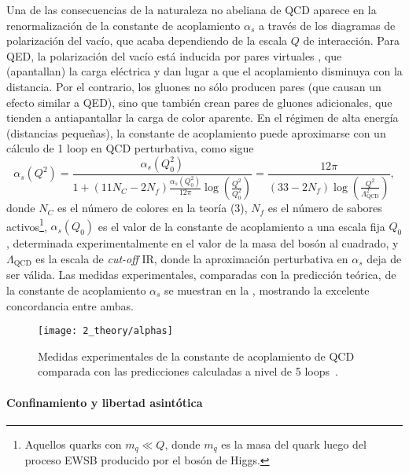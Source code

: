 Una de las consecuencias de la naturaleza no abeliana de \ac{QCD} aparece en la renormalización de la constante de acoplamiento \(\alpha_s\) a través de los diagramas de polarización del vacío, que acaba dependiendo de la escala \(Q\) de interacción. Para \ac{QED}, la polarización del vacío está inducida por pares virtuales \ee, que (apantallan) la carga eléctrica y dan lugar a que el acoplamiento disminuya con la distancia. Por el contrario, los gluones no sólo producen pares \qqbar (que causan un efecto similar a \ac{QED}), sino que también crean pares de gluones adicionales, que tienden a antiapantallar la carga de color aparente. En el régimen de alta energía (distancias pequeñas), la constante de acoplamiento puede aproximarse con un cálculo de 1 loop en \ac{QCD} perturbativa, como sigue
\begin{equation}
    \label{eq:theory:sm:mathematical:qcd:alphas}
    \alpha_s\left(Q^2\right) = 
    \frac{
        \alpha_s\left(Q^2_0\right)
    }{
        1 + \left(11 N_C - 2 N_f\right) \frac{\alpha_s\left(Q_0^2\right)}{12\pi} \log \left(\frac{Q^2}{Q_0^2}\right)
    }
    =
    \frac{
        12\pi
    }{
        \left(33 - 2 N_f\right)  \log \left(\frac{Q^2}{\Lambda_{\text{QCD}}^2}\right)
    },
\end{equation}
donde \(N_C\) es el número de colores en la teoría (3), \(N_f\) es el número de sabores activos\footnote{Aquellos quarks con \(m_q \ll Q\), donde \(m_q\) es la masa del quark luego del proceso \ac{EWSB} producido por el bosón de Higgs.}, \(\alpha_s\left(Q_0\right)\) es el valor de la constante de acoplamiento a una escala fija \(Q_0\), determinada experimentalmente en el valor de la masa del bosón \Zboson al cuadrado, y \(\Lambda_{\text{QCD}}\) es la escala de \textit{cut-off} \ac{IR}, donde la aproximación perturbativa en \(\alpha_s\) deja de ser válida. Las medidas experimentales, comparadas con la predicción teórica, de la constante de acoplamiento \(\alpha_s\) se muestran en la \Fig{\ref{fig:theory:sm:mathematical:qcd:alphas}}, mostrando la excelente concordancia entre ambas.

\begin{figure}[ht!]
    \centering
    \texttt{[image: 2\_theory/alphas]}
    \caption{Medidas experimentales de la constante de acoplamiento de \ac{QCD} comparada con las predicciones calculadas a nivel de 5 loops~\cite{ParticleDataGroup2024}.}
    \label{fig:theory:sm:mathematical:qcd:alphas}
\end{figure}


\paragraph{Confinamiento y libertad asint\'otica}

